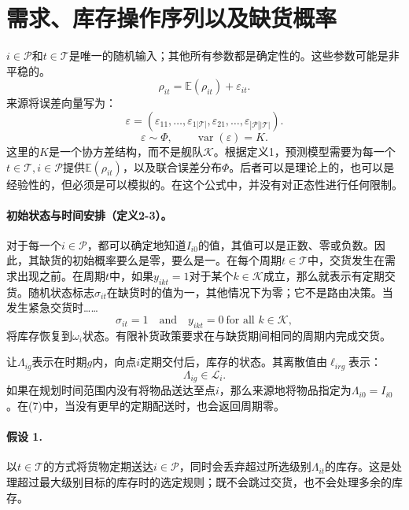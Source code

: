 \documentclass[10pt]{article}
\begin{document}
\section*{需求、库存操作序列以及缺货概率}
$i\in\mathcal P$和$t\in\mathcal T$是唯一的随机输入；其他所有参数都是确定性的。这些参数可能是非平稳的。
\begin{equation}
\rho_{it}=\mathbb E(\rho_{it})+\varepsilon_{it}.
\tag{1}
\end{equation}
来源将误差向量写为：
\begin{equation}
\varepsilon=(\varepsilon_{11},\ldots,\varepsilon_{1|\mathcal T|},\varepsilon_{21},\ldots,\varepsilon_{|\mathcal P||\mathcal T|}).
\tag{2}
\end{equation}
\[
\varepsilon\sim\Phi,\qquad\operatorname{var}(\varepsilon)=K.
\]
这里的$K$是一个协方差结构，而不是舰队$\mathcal K$。根据定义1，预测模型需要为每一个$t\in\mathcal T,i\in\mathcal P$提供$\mathbb E(\rho_{it})$，以及联合误差分布$\Phi$。后者可以是理论上的，也可以是经验性的，但必须是可以模拟的。在这个公式中，并没有对正态性进行任何限制。

\paragraph{初始状态与时间安排（定义2-3）。}
对于每一个$i\in\mathcal P$，都可以确定地知道$I_{i0}$的值，其值可以是正数、零或负数。因此，其缺货的初始概率要么是零，要么是一。在每个周期$t\in\mathcal T$中，交货发生在需求出现之前。在周期$t$中，如果$y_{ikt}=1$对于某个$k\in\mathcal K$成立，那么就表示有定期交货。随机状态标志$\sigma_{it}$在缺货时的值为一，其他情况下为零；它不是路由决策。当发生紧急交货时……
\[
\sigma_{it}=1\quad\text{and}\quad y_{ikt}=0\ \text{for all }k\in\mathcal K,
\]
将库存恢复到$\omega_i$状态。有限补货政策要求在与缺货期间相同的周期内完成交货。

让$\Lambda_{ig}$表示在时期$g$内，向点$i$定期交付后，库存的状态。其离散值由$\ell_{irg}$表示：
\[
\Lambda_{ig}\in\mathcal L_i.
\]
如果在规划时间范围内没有将物品送达至点$i$，那么来源地将物品指定为$\Lambda_{i0}=I_{i0}$。在(7)中，当没有更早的定期配送时，也会返回周期零。

\paragraph{假设 1.}
以$t\in\mathcal T$的方式将货物定期送达$i\in\mathcal P$，同时会丢弃超过所选级别$\Lambda_{it}$的库存。这是处理超过最大级别目标的库存时的选定规则；既不会跳过交货，也不会处理多余的库存。
\end{document}
